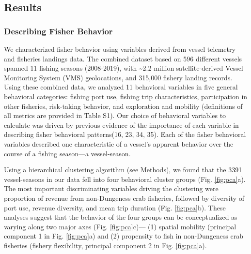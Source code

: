 \documentclass[9pt,twocolumn,twoside,lineno]{pnas-new}
\begin{document}
\hypertarget{results}{%
\subsection*{Results}\label{results}}

\hypertarget{describing-fisher-behavior}{%
\subsubsection*{Describing Fisher
Behavior}\label{describing-fisher-behavior}}

We characterized fisher behavior using variables derived from vessel
telemetry and fisheries landings data. The combined dataset based on 596
different vessels spanned 11 fishing seasons (2008-2019), with
\textasciitilde2.2 million satellite-derived Vessel Monitoring System
(VMS) geolocations, and 315,000 fishery landing records. Using these
combined data, we analyzed 11 behavioral variables in five general
behavioral categories: fishing port use, fishing trip characteristics,
participation in other fisheries, risk-taking behavior, and exploration
and mobility (definitions of all metrics are provided in Table S1). Our
choice of behavioral variables to calculate was driven by previous
evidence of the importance of each variable in describing fisher
behavioral patterns(16, 23, 34, 35). Each of the fisher behavioral
variables described one characteristic of a vessel's apparent behavior
over the course of a fishing season---a vessel-season.

Using a hierarchical clustering algorithm (see Methods), we found that
the 3391 vessel-seasons in our data fell into four behavioral cluster
groups (Fig. \ref{fig:pca}a). The most important discriminating
variables driving the clustering were proportion of revenue from
non-Dungeness crab fisheries, followed by diversity of port use, revenue
diversity, and mean trip duration (Fig. \ref{fig:pca}b). These analyses
suggest that the behavior of the four groups can be conceptualized as
varying along two major axes (Fig. \ref{fig:pca}c)--- (1) spatial
mobility (principal component 1 in Fig. \ref{fig:pca}a) and (2)
propensity to fish in non-Dungeness crab fisheries (fishery flexibility,
principal component 2 in Fig. \ref{fig:pca}a).
\end{document}
